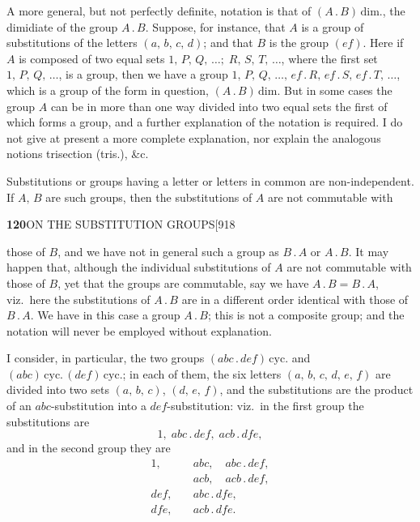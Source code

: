 \documentclass[11pt]{article}
\begin{document}
\hspace{1em} A more general, but not perfectly definite, notation is that of
$(A\,.\,B)\,\text{dim.}$, the dimidiate of the group $A\,.\,B$. Suppose, for
instance, that $A$ is a group of substitutions of the letters
$(a,\,b,\,c,\,d)$; and that $B$ is the group $(ef)$. Here if $A$ is composed
of two equal sets $1,\,P,\,Q,\,\ldots;\;R,\,S,\,T,\,\ldots$, where the first
set $1,\,P,\,Q,\,\ldots$, is a group, then we have a group
$1,\,P,\,Q,\,\ldots,\,ef\,.\,R,\,ef\,.\,S,\,ef\,.\,T,\,\ldots$, which is a
group of the form in question, $(A\,.\,B)\,\text{dim.}$ But in some cases
the group $A$ can be in more than one way divided into two equal sets the
first of which forms a group, and a further explanation of the notation is
required. I do not give at present a more complete explanation, nor explain
the analogous notions trisection (tris.), \&c.

\hspace{1em} Substitutions or groups having a letter or letters in common are
non-independent. If $A,\,B$ are such groups, then the substitutions of $A$
are not commutable with

\newpage
\noindent\textbf{120}\hfill ON THE SUBSTITUTION GROUPS\hfill[918

\smallskip
those of $B$, and we have not in general such a group as $B\,.\,A$ or
$A\,.\,B$. It may happen that, although the individual substitutions of $A$
are not commutable with those of $B$, yet that the groups are commutable, say
we have $A\,.\,B=B\,.\,A$, viz.\ here the substitutions of $A\,.\,B$ are in
a different order identical with those of $B\,.\,A$. We have in this case a
group $A\,.\,B$; this is not a composite group; and the notation will never
be employed without explanation.

\hspace{1em} I consider, in particular, the two groups
$(abc\,.\,def)\,\text{cyc.}$ and $(abc)\,\text{cyc.}\,(def)\,\text{cyc.}$;
in each of them, the six letters $(a,\,b,\,c,\,d,\,e,\,f)$ are divided into
two sets $(a,\,b,\,c)$, $(d,\,e,\,f)$, and the substitutions are the product
of an $abc$-substitution into a $def$-substitution: viz.\ in the first group
the substitutions are
\[
1,\;abc\,.\,def,\;acb\,.\,dfe,
\]
and in the second group they are
\[
\begin{aligned}
1,&\quad abc,\quad abc\,.\,def,\\
&\quad acb,\quad acb\,.\,def,\\
def,&\quad abc\,.\,dfe,\\
dfe,&\quad acb\,.\,dfe.
\end{aligned}
\]
\end{document}
